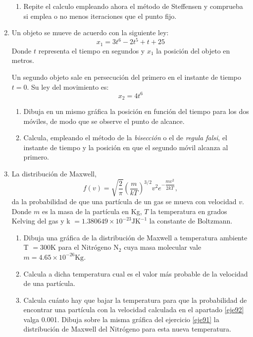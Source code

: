 \begin{enumerate}
\begin{enumerate}
\item Repite el calculo empleando ahora el método de Steffensen y comprueba si emplea o no menos iteraciones que el punto fijo.
\end{enumerate}

\item Un objeto se mueve de acuerdo con la siguiente ley:
\begin{equation}
x_1 = 3t^6 - 2t^5 + t + 25
\end{equation}
Donde  $t$ representa el tiempo en segundos y $x_1$ la posición del objeto en metros.

 Un segundo objeto sale en persecución del primero en el instante de tiempo $t=0$. Su ley del movimiento es:
\begin{equation}
x_2 = 4t^6
\end{equation}
\begin{enumerate}
\item Dibuja en un mismo gráfica la posición en función del tiempo para los dos móviles, de modo que se observe el punto de alcance.  
\item Calcula, empleando el método de la \emph{bisección} o el de \emph{regula falsi},  el instante de tiempo y la posición en que el segundo móvil alcanza al primero.
\end{enumerate}

\item La distribución de Maxwell, 
\begin{equation}
f(v) = \sqrt{\frac{2}{\pi}}\left( \frac{m}{kT}\right)^{3/2}v^2e^{-\dfrac{\scriptstyle mv^2}{\scriptstyle 2kT}},
\end{equation}
da la probabilidad de que una partícula de un gas se mueva con velocidad $v$. Donde $m$ es la masa de la partícula en Kg, $T$ la temperatura en grados Kelving del gas y k $=1.380649\times 10^{-23} \text{JK}^{-1}$ la constante de Boltzmann. 
\begin{enumerate}
\item  \label{eje91}Dibuja una gráfica de la distribución de Maxwell a temperatura ambiente T $= 300$K para el Nitrógeno N$_2$  cuya masa molecular vale $m = 4.65 \times 10^{-26}	\text{Kg}$.
\item \label{eje92}Calcula a dicha temperatura cual es el valor más probable de la velocidad de una partícula.
\item Calcula cuánto hay que bajar la temperatura para que la probabilidad de encontrar una partícula con la velocidad calculada en el apartado \ref{eje92} valga 0.001. Dibuja sobre la misma gráfica del ejercicio \ref{eje91} la distribución de Maxwell del Nitrógeno para esta nueva temperatura. 

\end{enumerate}

\end{enumerate}

